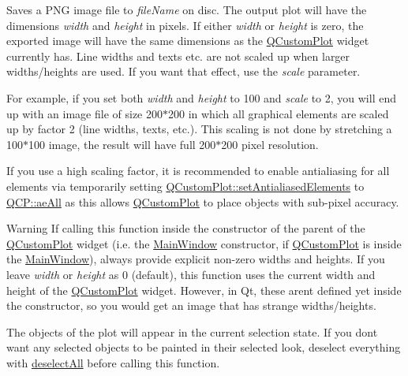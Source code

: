 Saves a P\+NG image file to {\itshape file\+Name} on disc. The output plot will have the dimensions {\itshape width} and {\itshape height} in pixels. If either {\itshape width} or {\itshape height} is zero, the exported image will have the same dimensions as the \mbox{\hyperlink{class_q_custom_plot}{Q\+Custom\+Plot}} widget currently has. Line widths and texts etc. are not scaled up when larger widths/heights are used. If you want that effect, use the {\itshape scale} parameter.

For example, if you set both {\itshape width} and {\itshape height} to 100 and {\itshape scale} to 2, you will end up with an image file of size 200$\ast$200 in which all graphical elements are scaled up by factor 2 (line widths, texts, etc.). This scaling is not done by stretching a 100$\ast$100 image, the result will have full 200$\ast$200 pixel resolution.

If you use a high scaling factor, it is recommended to enable antialiasing for all elements via temporarily setting \mbox{\hyperlink{class_q_custom_plot_af6f91e5eab1be85f67c556e98c3745e8}{Q\+Custom\+Plot\+::set\+Antialiased\+Elements}} to \mbox{\hyperlink{namespace_q_c_p_ae55dbe315d41fe80f29ba88100843a0caa897c232a0ffc8368e7c100ffc59ef31}{Q\+C\+P\+::ae\+All}} as this allows \mbox{\hyperlink{class_q_custom_plot}{Q\+Custom\+Plot}} to place objects with sub-\/pixel accuracy.

\begin{DoxyWarning}{Warning}
If calling this function inside the constructor of the parent of the \mbox{\hyperlink{class_q_custom_plot}{Q\+Custom\+Plot}} widget (i.\+e. the \mbox{\hyperlink{class_main_window}{Main\+Window}} constructor, if \mbox{\hyperlink{class_q_custom_plot}{Q\+Custom\+Plot}} is inside the \mbox{\hyperlink{class_main_window}{Main\+Window}}), always provide explicit non-\/zero widths and heights. If you leave {\itshape width} or {\itshape height} as 0 (default), this function uses the current width and height of the \mbox{\hyperlink{class_q_custom_plot}{Q\+Custom\+Plot}} widget. However, in Qt, these aren\textquotesingle{}t defined yet inside the constructor, so you would get an image that has strange widths/heights.
\end{DoxyWarning}
The objects of the plot will appear in the current selection state. If you don\textquotesingle{}t want any selected objects to be painted in their selected look, deselect everything with \mbox{\hyperlink{class_q_custom_plot_a9d4808ab925b003054085246c92a257c}{deselect\+All}} before calling this function.

